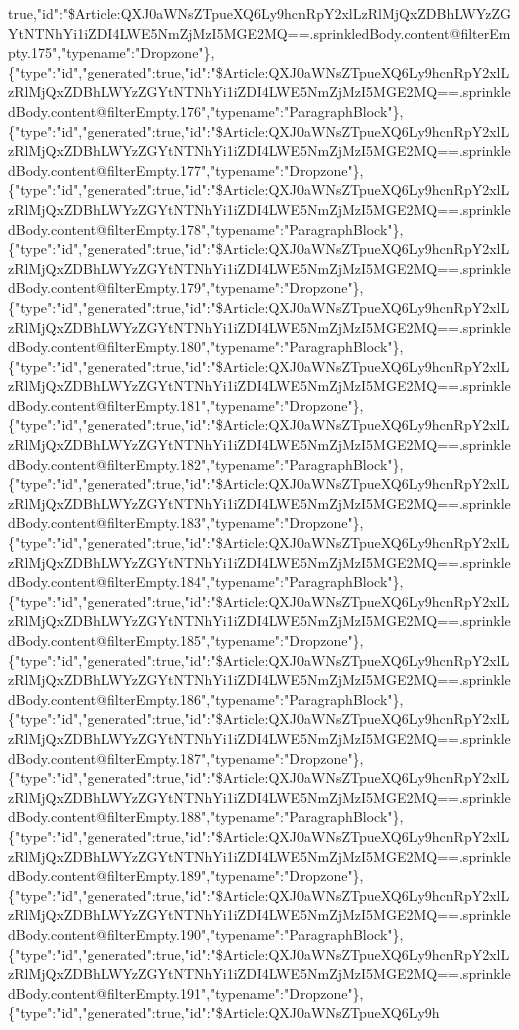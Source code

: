 true,"id":"\$Article:QXJ0aWNsZTpueXQ6Ly9hcnRpY2xlLzRlMjQxZDBhLWYzZGYtNTNhYi1iZDI4LWE5NmZjMzI5MGE2MQ==.sprinkledBody.content@filterEmpty.175","typename":"Dropzone"\},\{"type":"id","generated":true,"id":"\$Article:QXJ0aWNsZTpueXQ6Ly9hcnRpY2xlLzRlMjQxZDBhLWYzZGYtNTNhYi1iZDI4LWE5NmZjMzI5MGE2MQ==.sprinkledBody.content@filterEmpty.176","typename":"ParagraphBlock"\},\{"type":"id","generated":true,"id":"\$Article:QXJ0aWNsZTpueXQ6Ly9hcnRpY2xlLzRlMjQxZDBhLWYzZGYtNTNhYi1iZDI4LWE5NmZjMzI5MGE2MQ==.sprinkledBody.content@filterEmpty.177","typename":"Dropzone"\},\{"type":"id","generated":true,"id":"\$Article:QXJ0aWNsZTpueXQ6Ly9hcnRpY2xlLzRlMjQxZDBhLWYzZGYtNTNhYi1iZDI4LWE5NmZjMzI5MGE2MQ==.sprinkledBody.content@filterEmpty.178","typename":"ParagraphBlock"\},\{"type":"id","generated":true,"id":"\$Article:QXJ0aWNsZTpueXQ6Ly9hcnRpY2xlLzRlMjQxZDBhLWYzZGYtNTNhYi1iZDI4LWE5NmZjMzI5MGE2MQ==.sprinkledBody.content@filterEmpty.179","typename":"Dropzone"\},\{"type":"id","generated":true,"id":"\$Article:QXJ0aWNsZTpueXQ6Ly9hcnRpY2xlLzRlMjQxZDBhLWYzZGYtNTNhYi1iZDI4LWE5NmZjMzI5MGE2MQ==.sprinkledBody.content@filterEmpty.180","typename":"ParagraphBlock"\},\{"type":"id","generated":true,"id":"\$Article:QXJ0aWNsZTpueXQ6Ly9hcnRpY2xlLzRlMjQxZDBhLWYzZGYtNTNhYi1iZDI4LWE5NmZjMzI5MGE2MQ==.sprinkledBody.content@filterEmpty.181","typename":"Dropzone"\},\{"type":"id","generated":true,"id":"\$Article:QXJ0aWNsZTpueXQ6Ly9hcnRpY2xlLzRlMjQxZDBhLWYzZGYtNTNhYi1iZDI4LWE5NmZjMzI5MGE2MQ==.sprinkledBody.content@filterEmpty.182","typename":"ParagraphBlock"\},\{"type":"id","generated":true,"id":"\$Article:QXJ0aWNsZTpueXQ6Ly9hcnRpY2xlLzRlMjQxZDBhLWYzZGYtNTNhYi1iZDI4LWE5NmZjMzI5MGE2MQ==.sprinkledBody.content@filterEmpty.183","typename":"Dropzone"\},\{"type":"id","generated":true,"id":"\$Article:QXJ0aWNsZTpueXQ6Ly9hcnRpY2xlLzRlMjQxZDBhLWYzZGYtNTNhYi1iZDI4LWE5NmZjMzI5MGE2MQ==.sprinkledBody.content@filterEmpty.184","typename":"ParagraphBlock"\},\{"type":"id","generated":true,"id":"\$Article:QXJ0aWNsZTpueXQ6Ly9hcnRpY2xlLzRlMjQxZDBhLWYzZGYtNTNhYi1iZDI4LWE5NmZjMzI5MGE2MQ==.sprinkledBody.content@filterEmpty.185","typename":"Dropzone"\},\{"type":"id","generated":true,"id":"\$Article:QXJ0aWNsZTpueXQ6Ly9hcnRpY2xlLzRlMjQxZDBhLWYzZGYtNTNhYi1iZDI4LWE5NmZjMzI5MGE2MQ==.sprinkledBody.content@filterEmpty.186","typename":"ParagraphBlock"\},\{"type":"id","generated":true,"id":"\$Article:QXJ0aWNsZTpueXQ6Ly9hcnRpY2xlLzRlMjQxZDBhLWYzZGYtNTNhYi1iZDI4LWE5NmZjMzI5MGE2MQ==.sprinkledBody.content@filterEmpty.187","typename":"Dropzone"\},\{"type":"id","generated":true,"id":"\$Article:QXJ0aWNsZTpueXQ6Ly9hcnRpY2xlLzRlMjQxZDBhLWYzZGYtNTNhYi1iZDI4LWE5NmZjMzI5MGE2MQ==.sprinkledBody.content@filterEmpty.188","typename":"ParagraphBlock"\},\{"type":"id","generated":true,"id":"\$Article:QXJ0aWNsZTpueXQ6Ly9hcnRpY2xlLzRlMjQxZDBhLWYzZGYtNTNhYi1iZDI4LWE5NmZjMzI5MGE2MQ==.sprinkledBody.content@filterEmpty.189","typename":"Dropzone"\},\{"type":"id","generated":true,"id":"\$Article:QXJ0aWNsZTpueXQ6Ly9hcnRpY2xlLzRlMjQxZDBhLWYzZGYtNTNhYi1iZDI4LWE5NmZjMzI5MGE2MQ==.sprinkledBody.content@filterEmpty.190","typename":"ParagraphBlock"\},\{"type":"id","generated":true,"id":"\$Article:QXJ0aWNsZTpueXQ6Ly9hcnRpY2xlLzRlMjQxZDBhLWYzZGYtNTNhYi1iZDI4LWE5NmZjMzI5MGE2MQ==.sprinkledBody.content@filterEmpty.191","typename":"Dropzone"\},\{"type":"id","generated":true,"id":"\$Article:QXJ0aWNsZTpueXQ6Ly9h